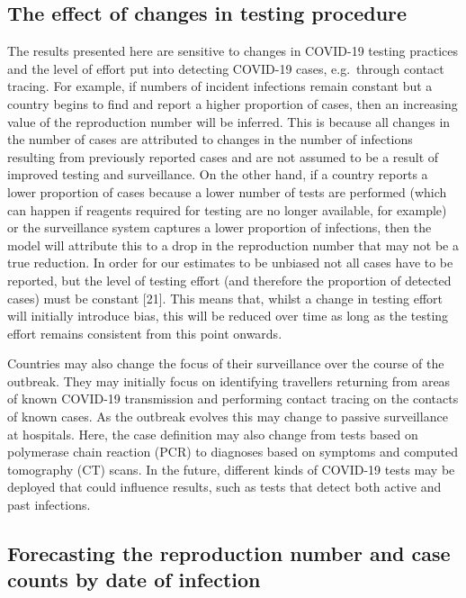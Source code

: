 \documentclass[
]{article}
\begin{document}
\hypertarget{the-effect-of-changes-in-testing-procedure}{%
\subsection{The effect of changes in testing
procedure}\label{the-effect-of-changes-in-testing-procedure}}

The results presented here are sensitive to changes in COVID-19 testing
practices and the level of effort put into detecting COVID-19 cases,
e.g.~through contact tracing. For example, if numbers of incident
infections remain constant but a country begins to find and report a
higher proportion of cases, then an increasing value of the reproduction
number will be inferred. This is because all changes in the number of
cases are attributed to changes in the number of infections resulting
from previously reported cases and are not assumed to be a result of
improved testing and surveillance. On the other hand, if a country
reports a lower proportion of cases because a lower number of tests are
performed (which can happen if reagents required for testing are no
longer available, for example) or the surveillance system captures a
lower proportion of infections, then the model will attribute this to a
drop in the reproduction number that may not be a true reduction. In
order for our estimates to be unbiased not all cases have to be
reported, but the level of testing effort (and therefore the proportion
of detected cases) must be constant {[}21{]}. This means that, whilst a
change in testing effort will initially introduce bias, this will be
reduced over time as long as the testing effort remains consistent from
this point onwards.

Countries may also change the focus of their surveillance over the
course of the outbreak. They may initially focus on identifying
travellers returning from areas of known COVID-19 transmission and
performing contact tracing on the contacts of known cases. As the
outbreak evolves this may change to passive surveillance at hospitals.
Here, the case definition may also change from tests based on polymerase
chain reaction (PCR) to diagnoses based on symptoms and computed
tomography (CT) scans. In the future, different kinds of COVID-19 tests
may be deployed that could influence results, such as tests that detect
both active and past infections.

\hypertarget{forecasting-the-reproduction-number-and-case-counts-by-date-of-infection}{%
\subsection{Forecasting the reproduction number and case counts by date
of
infection}\label{forecasting-the-reproduction-number-and-case-counts-by-date-of-infection}}
\end{document}
